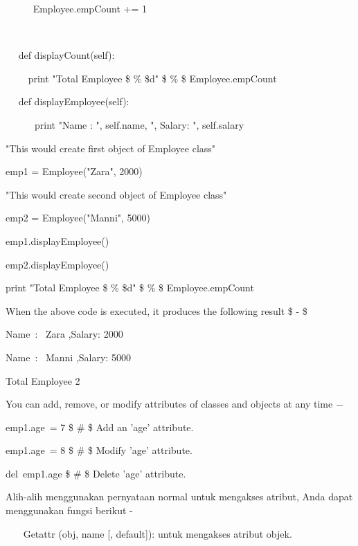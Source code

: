 \noindent 
~~~~~ Employee.empCount += 1 \par
\noindent 
~~  \par
\noindent 
~~ def displayCount(self): \par
\noindent 
~~~~ print "Total Employee  \$  \%  \$d"  \$  \%  \$ Employee.empCount \par
\vspace{12pt}
\noindent 
~~ def displayEmployee(self): \par
\noindent 
~~~~~~print "Name : ", self.name,  ", Salary: ", self.salary \par
\vspace{12pt}
\noindent 
"This would create first object of Employee class" \par
\noindent 
emp1 = Employee("Zara", 2000) \par
\noindent 
"This would create second object of Employee class" \par
\noindent 
emp2 = Employee("Manni", 5000) \par
\noindent 
emp1.displayEmployee() \par
\noindent 
emp2.displayEmployee() \par
\noindent 
print "Total Employee  \$  \%  \$d"  \$  \%  \$ Employee.empCount \par
\noindent 
When the above code is executed, it produces the following result  \$ - \$ \par
\noindent 
Name~:~ Zara ,Salary:  2000 \par
\noindent 
Name~:~ Manni ,Salary:  5000 \par
\noindent 
Total Employee 2 \par
\noindent 
You can add, remove, or modify attributes of classes and objects at any time  $ - $ \par
\noindent 
emp1.age~= 7   \$  \#  \$ Add an 'age' attribute. \par
\noindent 
emp1.age~= 8   \$  \#  \$ Modify 'age' attribute. \par
\noindent 
del~emp1.age   \$  \#  \$ Delete 'age' attribute. \par
\vspace{12pt}
Alih-alih menggunakan pernyataan normal untuk mengakses atribut, Anda dapat menggunakan fungsi berikut - \par
\vspace{12pt}
\noindent 
~~~ Getattr (obj, name [, default]): untuk mengakses atribut objek. \par
\vspace{12pt}
